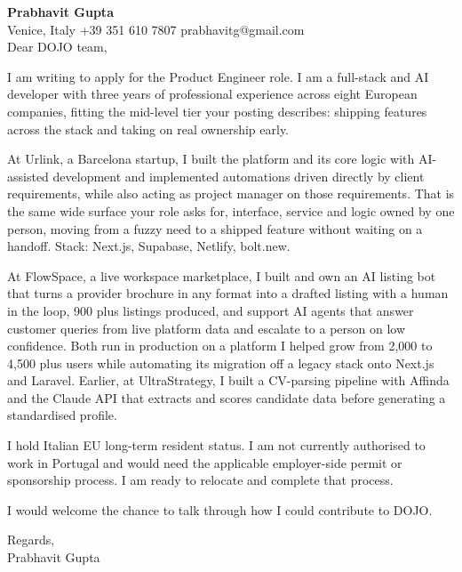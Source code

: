 \documentclass[a4paper,10.5pt]{article}
\begin{document}
\textbf{Prabhavit Gupta}\\
Venice, Italy \textbar{} +39 351 610 7807 \textbar{} prabhavitg@gmail.com\\[10pt]
Dear DOJO team,

I am writing to apply for the Product Engineer role. I am a full-stack and AI developer with three years of professional experience across eight European companies, fitting the mid-level tier your posting describes: shipping features across the stack and taking on real ownership early.

At Urlink, a Barcelona startup, I built the platform and its core logic with AI-assisted development and implemented automations driven directly by client requirements, while also acting as project manager on those requirements. That is the same wide surface your role asks for, interface, service and logic owned by one person, moving from a fuzzy need to a shipped feature without waiting on a handoff. Stack: Next.js, Supabase, Netlify, bolt.new.

At FlowSpace, a live workspace marketplace, I built and own an AI listing bot that turns a provider brochure in any format into a drafted listing with a human in the loop, 900 plus listings produced, and support AI agents that answer customer queries from live platform data and escalate to a person on low confidence. Both run in production on a platform I helped grow from 2,000 to 4,500 plus users while automating its migration off a legacy stack onto Next.js and Laravel. Earlier, at UltraStrategy, I built a CV-parsing pipeline with Affinda and the Claude API that extracts and scores candidate data before generating a standardised profile.

I hold Italian EU long-term resident status. I am not currently authorised to work in Portugal and would need the applicable employer-side permit or sponsorship process. I am ready to relocate and complete that process.

I would welcome the chance to talk through how I could contribute to DOJO.

Regards,\\
Prabhavit Gupta
\end{document}
